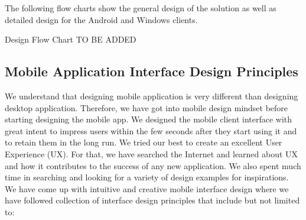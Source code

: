 \documentclass{article}
\begin{document}
The following flow charts show the general design of the solution as well as detailed design for the Android and Windows clients.

Design Flow Chart TO BE ADDED

\subsection{Mobile Application Interface Design Principles}
We understand that designing mobile application is very different than designing desktop application.
Therefore, we have got into mobile design mindset before starting designing the mobile app.
We designed the mobile client interface with great intent to impress users within the few seconds after they start using it and to retain them in the long run. We tried our best to create an excellent User Experience (UX). For that, we have searched the Internet and learned about UX and how it contributes to the success of any new application. We also spent much time in searching and looking for a variety of design examples for inspirations. We have come up with intuitive and creative mobile interface design where we have followed collection of interface design principles that include but not limited to:
\end{document}
